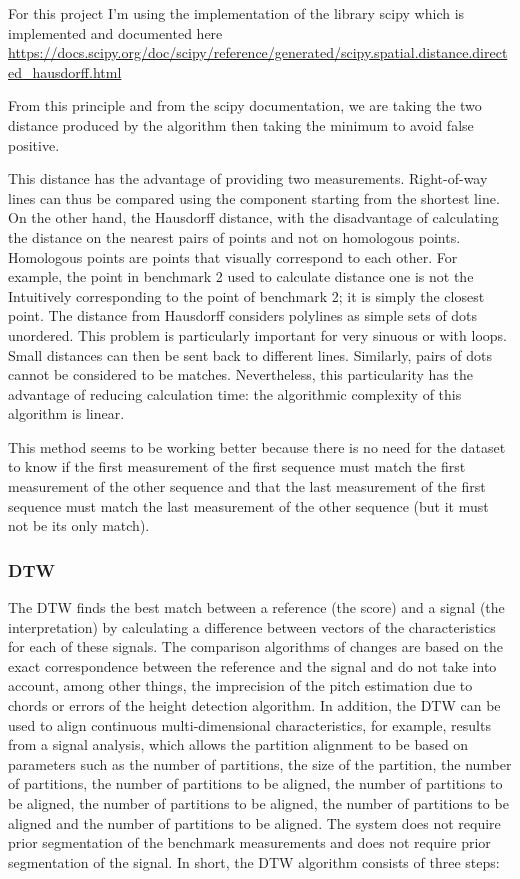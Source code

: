 \documentclass{article}
\begin{document}
For this project I'm using the implementation of the library scipy which is implemented and documented here \url{https://docs.scipy.org/doc/scipy/reference/generated/scipy.spatial.distance.directed_hausdorff.html}

From this principle and from the scipy documentation, we are taking the two distance produced by the algorithm then taking the minimum to avoid false positive.

This distance has the advantage of providing two measurements. Right-of-way lines can thus be compared using the component starting from the shortest line. On the other hand, the Hausdorff distance, with the disadvantage of calculating the
distance on the nearest pairs of points and not on homologous points. Homologous points are points that visually correspond to each other. For example, the point in benchmark 2 used to calculate distance one is not the Intuitively corresponding to the point of benchmark 2; it is simply the closest point. The distance from Hausdorff considers polylines as simple sets of dots unordered. This problem is particularly important for very sinuous or with loops. Small distances can then be sent back to different lines. Similarly, pairs of dots cannot be considered to be matches. Nevertheless, this particularity has the advantage of reducing calculation time: the algorithmic complexity of this algorithm is linear. 


This method seems to be working better because there is no need for the dataset to know if the first measurement of the first sequence must match the first measurement of the other sequence and that the last measurement of the first sequence must match the last measurement of the other sequence (but it must not be its only match).


\subsubsection{DTW}

 The DTW finds the best match between a reference (the score) and a signal (the interpretation) by calculating a difference between vectors of the characteristics for each of these signals. The comparison algorithms of changes are based on the exact correspondence between the reference and the signal and do not take into account, among other things, the imprecision of the pitch estimation due to chords or errors of the height detection algorithm. In addition, the DTW can be used to align continuous multi-dimensional characteristics, for example, results from a signal analysis, which allows the partition alignment to be based on parameters such as the number of partitions, the size of the partition, the number of partitions, the number of partitions to be aligned, the number of partitions to be aligned, the number of partitions to be aligned, the number of partitions to be aligned and the number of partitions to be aligned.
The system does not require prior segmentation of the benchmark measurements and does not require prior segmentation of the
signal.
In short, the DTW algorithm consists of three steps:
\end{document}
